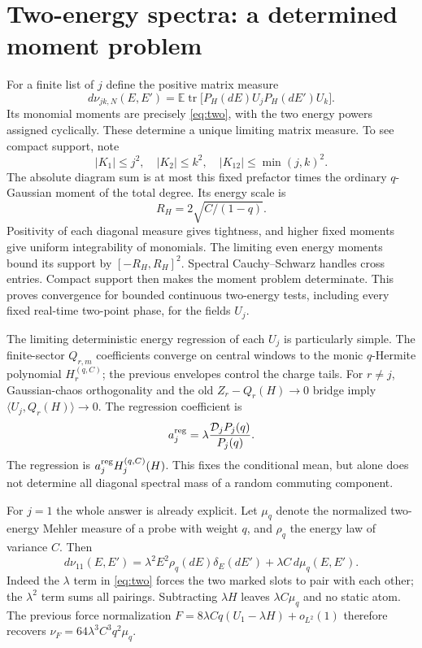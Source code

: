 \documentclass[11pt]{article}
\newcommand{\EE}{\mathbb E}
\newcommand{\tr}{\operatorname{tr}}
\newcommand{\mathscr}{\mathcal}
\begin{document}
\section{Two-energy spectra: a determined moment problem}
For a finite list of $j$ define the positive matrix measure
\begin{equation}
 d\nu_{jk,N}(E,E')=
 \EE\tr\bigl[P_H(dE)U_jP_H(dE')U_k\bigr].
\end{equation}
Its monomial moments are precisely \eqref{eq:two}, with the two
energy powers assigned cyclically. These determine a unique limiting
matrix measure. To see compact support, note
\begin{equation}
 |K_1|\le j^2,\quad |K_2|\le k^2,
 \quad |K_{12}|\le\min(j,k)^2.
\end{equation}
The absolute diagram sum is at most this fixed prefactor times the
ordinary $q$-Gaussian moment of the total degree. Its energy scale is
\begin{equation}
 R_H=2\sqrt{C/(1-q)}.
\end{equation}
Positivity of each diagonal measure gives tightness, and higher
fixed moments give uniform integrability of monomials. The limiting
even energy moments bound its support by $[-R_H,R_H]^2$.
Spectral Cauchy--Schwarz handles cross entries. Compact support then
makes the moment problem determinate. This proves convergence for
bounded continuous two-energy tests, including every fixed real-time
two-point phase, for the fields $U_j$.

The limiting deterministic energy regression of each $U_j$ is
particularly simple. The finite-sector $Q_{r,m}$ coefficients converge
on central windows to the monic $q$-Hermite polynomial
$H_r^{(q,C)}$; the previous envelopes control the charge tails.
For $r\ne j$, Gaussian-chaos orthogonality and the old
$Z_r-Q_r(H)\to0$ bridge imply
$\langle U_j,Q_r(H)\rangle\to0$. The regression coefficient is
\begin{equation}
 a_j^{\rm reg}=\lambda\frac{\mathscr D_jP_j(q)}{P_j(q)}.
\end{equation}
The regression is $a_j^{\rm reg}H_j^{(q,C)}(H)$.
This fixes the conditional mean, but alone does not determine all
diagonal spectral mass of a random commuting component.

For $j=1$ the whole answer is already explicit. Let $\mu_q$ denote
the normalized two-energy Mehler measure of a probe with weight $q$,
and $\rho_q$ the energy law of variance $C$. Then
\begin{equation}
 d\nu_{11}(E,E')=
 \lambda^2 E^2\rho_q(dE)\delta_E(dE')+\lambda C\,d\mu_q(E,E').
\end{equation}
Indeed the $\lambda$ term in \eqref{eq:two} forces the two marked
slots to pair with each other; the $\lambda^2$ term sums all pairings.
Subtracting $\lambda H$ leaves $\lambda C\mu_q$ and no static atom.
The previous force normalization $F=8\lambda Cq(U_1-\lambda H)+o_{L^2}(1)$
therefore recovers $\nu_F=64\lambda^3C^3q^2\mu_q$.
\end{document}
